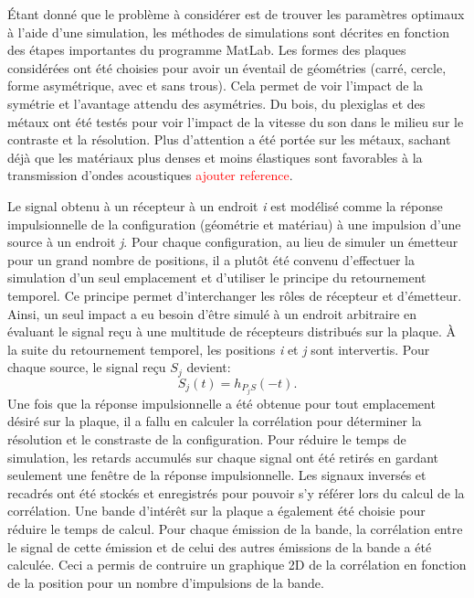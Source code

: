 \documentclass[conference]{IEEEtran}
\begin{document}

Étant donné que le problème à considérer est de trouver les paramètres 
optimaux à l'aide d'une simulation, les méthodes de simulations sont décrites
en fonction des étapes importantes du programme MatLab.
Les formes des plaques considérées ont été choisies pour avoir un éventail de 
géométries (carré, cercle, forme asymétrique, avec et sans trous). 
Cela permet de voir l'impact de la symétrie et l'avantage attendu des asymétries. 
Du bois, du plexiglas et des métaux ont été testés pour voir l'impact de la 
vitesse du son dans le milieu sur le contraste et la résolution. 
Plus d'attention a été portée sur les métaux, sachant déjà que les matériaux plus 
denses et moins élastiques sont favorables à  la transmission d'ondes acoustiques 
\textcolor{red}{ajouter reference}.

Le signal obtenu à un récepteur à un endroit \textit{i} est modélisé comme la réponse 
impulsionnelle de la configuration (géométrie et matériau) à une impulsion d'une source
à un endroit \textit{j}. 
Pour chaque configuration, au lieu de simuler un émetteur pour un grand nombre de 
positions, il a plutôt été convenu d'effectuer la simulation d'un seul emplacement 
et d'utiliser le principe du retournement temporel. 
Ce principe permet d'interchanger les rôles de récepteur et d'émetteur. 
Ainsi, un seul impact a eu besoin d'être simulé à un endroit arbitraire en évaluant 
le signal reçu à une multitude de récepteurs distribués sur la plaque. 
À la suite du retournement temporel, les positions \textit{i} et \textit{j} 
sont intervertis. 
Pour chaque source, le signal reçu \textit{$S_j$} devient:
\[S_j(t)=h_{P_jS}(-t).\]
Une fois que la réponse impulsionnelle a été obtenue pour tout emplacement désiré sur la plaque, il a 
fallu en calculer la corrélation pour déterminer la résolution et le constraste de la
configuration. 
Pour réduire le temps de simulation, les retards accumulés sur chaque signal ont été 
retirés en gardant seulement une fenêtre de la réponse impulsionnelle. 
Les signaux inversés et recadrés ont été stockés et enregistrés pour pouvoir s'y référer 
lors du calcul de la corrélation. 
Une bande d'intérêt sur la plaque a également été choisie pour réduire le temps de 
calcul. 
Pour chaque émission de la bande, la corrélation entre le signal de cette émission et
de celui des autres émissions de la bande a été calculée. 
Ceci a permis de contruire un graphique 2D de la corrélation en fonction de la position pour un
nombre d'impulsions de la bande. 
\end{document}
